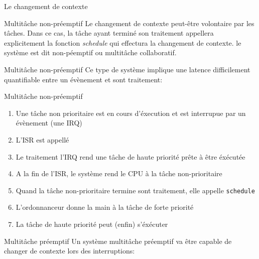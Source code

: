 \begin{frame}{Le changement de contexte}
  \begin{center}
  \end{center}
\end{frame}

\begin{frame}{Multitâche non-préemptif}
  Le changement de contexte  peut-être volontaire par les tâches. Dans
  ce   cas,  la   tâche   ayant  terminé   son  traitement   appellera
  explicitement   la  fonction   \emph{schedule}   qui  effectura   la
  changement  de   contexte.  le  système  est   dit  non-péemptif  ou
  multitâche collaboratif.
\end{frame}

\begin{frame}{Multitâche non-préemptif}
  Ce type  de système implique une  latence difficilement quantifiable
  entre un évènement et sont traitement:
  \begin{center}
  \end{center}
\end{frame}

\begin{frame}{Multitâche non-préemptif}
  \begin{enumerate} 
  \item  Une tâche  non prioritaire  est en  cours d'éxecution  et est
    interrupue par un évènement (une IRQ)
  \item L'ISR est appellé
  \item Le traitement  l'IRQ rend une tâche de  haute priorité prête à
    être éxécutée
  \item  A  la fin  de  l'ISR,  le système  rend  le  CPU  à la  tâche
    non-prioritaire
  \item Quand  la tâche non-prioritaire termine  sont traitement, elle
    appelle \texttt{schedule}
  \item L'ordonnanceur donne la main à la tâche de forte priorité
  \item La tâche de haute priorité peut (enfin) s'éxécuter
  \end{enumerate} 
\end{frame} 

\begin{frame}{Multitâche préemptif}
  Un  système  multitâche préemptif  va  être  capable  de changer  de
  contexte lors des interruptions:
  \begin{center}
  \end{center}
\end{frame}

